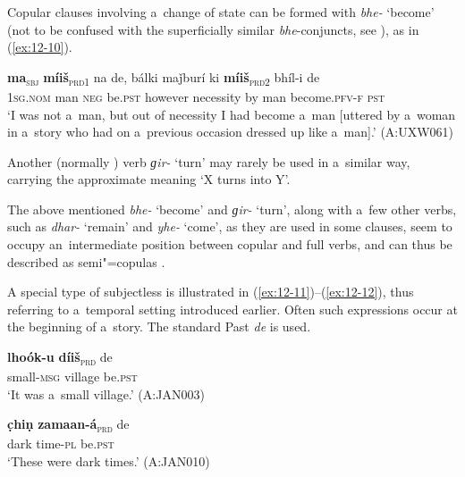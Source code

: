 Copular clauses involving a~change of state can be formed with \textit{bhe-} `become' (not to be confused with the superficially similar \textit{bhe}-conjuncts, see ), as in (\ref{ex:12-10}).

\ea
\label{ex:12-10}
\gll {\ob}\textbf{ma}{\cb}\textsubscript{\textsc{\upshape sbj}} {\ob}\textbf{míiš}{\cb}\textsubscript{\textsc{\upshape prd1}} na de, bálki maǰburí ki {\ob}\textbf{míiš}{\cb}\textsubscript{\textsc{\upshape prd2}} bhíl-i de \\
\textsc{1sg.nom} man \textsc{neg} be.\textsc{pst}  however necessity by man become.\textsc{pfv-f} \textsc{pst} \\
\glt `I was not a~man, but out of necessity I had become a~man [uttered by a~woman in a~story who had on a~previous occasion dressed up like a~man].' (A:UXW061)
\z

Another (normally ) verb \textit{ɡir-} `turn' may rarely be used in a~similar way, carrying the approximate meaning `X turns into Y'.



The above mentioned \textit{bhe-} `become' and \textit{ɡir-} `turn', along with a~few other verbs, such as \textit{dhar-} `remain' and \textit{yhe-} `come', as they are used in some clauses, seem to occupy an~intermediate position between copular and full verbs, and can thus be described as semi"=copulas \citep[5--6]{pustet2003}. 



A special type of subjectless  is illustrated in (\ref{ex:12-11})--(\ref{ex:12-12}), thus referring to a~temporal setting introduced earlier. Often such expressions occur at the beginning of a~story. The standard Past  \textit{de} is used.

\begin{exe}
\ex
\label{ex:12-11}
\gll {\ob}\textbf{lhoók-u} \textbf{díiš}{\cb}\textsubscript{\textsc{\upshape prd}} de \\
small-\textsc{msg} village be.\textsc{pst} \\
\glt `It was a~small village.' (A:JAN003)
\end{exe}
\begin{exe}
\ex
\label{ex:12-12}
\gll {\ob}\textbf{c̣hiṇ} \textbf{zamaan-á}{\cb}\textsubscript{\textsc{\upshape prd}} de \\
dark time-\textsc{pl} be.\textsc{pst} \\
\glt `These were dark times.' (A:JAN010)
\end{exe}

